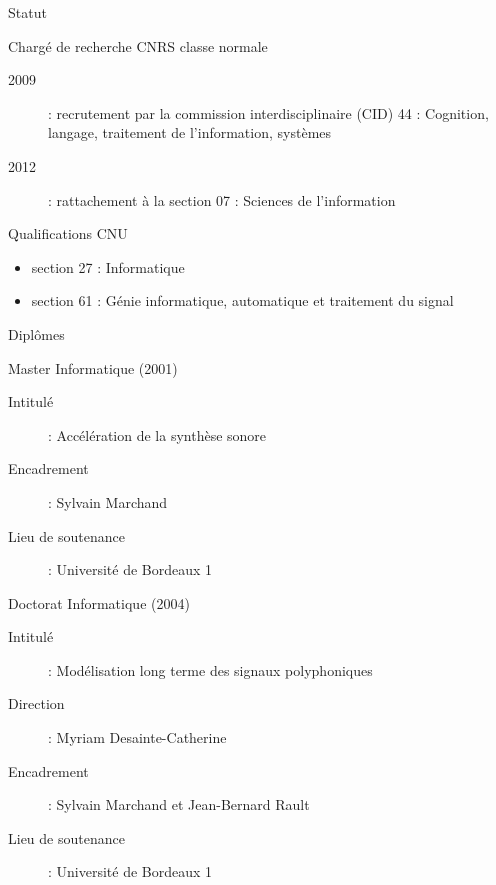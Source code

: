 \begin{frame}{Statut}
\begin{block}{Chargé de recherche CNRS classe normale}
\begin{description}
\item[2009] : recrutement par la commission interdisciplinaire (CID) 44 : \og Cognition, langage, traitement de l’information, systèmes \fg
\item[2012] : rattachement à la section 07 : \og Sciences de l'information \fg
\end{description}
\end{block}
\begin{block}{Qualifications CNU}
\begin{itemize}
\item section 27 : \og Informatique \fg
\item section 61 : \og Génie informatique, automatique et traitement du signal \fg
\end{itemize}
\end{block}
\end{frame}

\begin{frame}{Diplômes}
\begin{block}{Master Informatique (2001)}
\begin{description}
\item[Intitulé] : \og Accélération de la synthèse sonore \fg 
\item[Encadrement] : Sylvain Marchand 
\item[Lieu de soutenance] : Université de Bordeaux 1
\end{description}
\end{block}
\begin{block}{Doctorat Informatique (2004)}
\begin{description}
\item[Intitulé] : \og Modélisation long terme des signaux polyphoniques \fg 
\item[Direction] : Myriam Desainte-Catherine
\item[Encadrement] : Sylvain Marchand et Jean-Bernard Rault 
\item[Lieu de soutenance] : Université de Bordeaux 1 
\end{description}
\end{block}
\end{frame}


